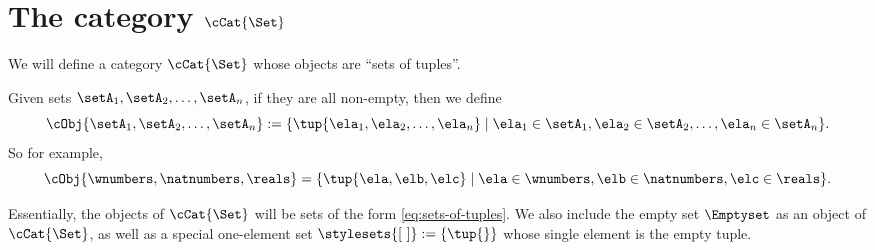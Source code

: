 
\section{The category $\cCat{\Set}$}

We will define a category $\cCat{\Set}$ whose objects are ``sets of tuples''.


%
%
%

Given sets $\setA_1, \setA_2, \dots , \setA_n$, if they are all non-empty, then we define
\begin{equation}\label{eq:sets-of-tuples}
   \cObj{\setA_1, \setA_2, \dots, \setA_n} := \{ \tup{\ela_1, \ela_2, \dots, \ela_n} \mid \ela_1 \in \setA_1, \ela_2 \in \setA_2, \dots, \ela_n \in \setA_n \}.
\end{equation}
So for example, 
\begin{equation}
    \cObj{\wnumbers, \natnumbers, \reals} = \{ \tup{\ela, \elb, \elc} \mid \ela \in \wnumbers, \elb \in \natnumbers, \elc \in \reals \}.
\end{equation}



Essentially, the objects of $\cCat{\Set}$ will be sets of the form \cref{eq:sets-of-tuples}. We also include the empty set $\Emptyset$ as an object of $\cCat{\Set}$, as well as a special one-element set $\stylesets{[ \ ]} := \{ \tup{} \}$ whose single element is the empty tuple. 

